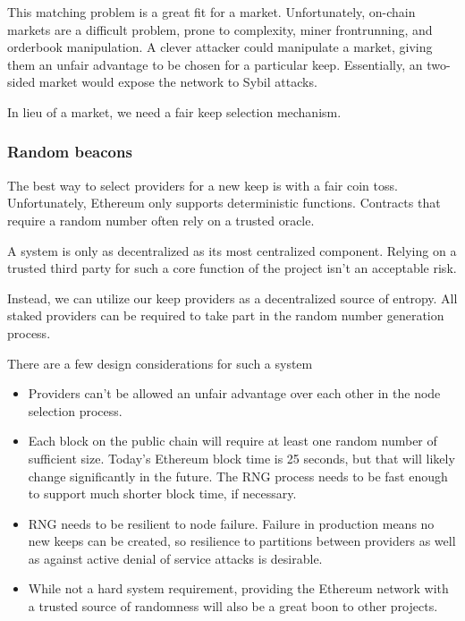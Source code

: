 \documentclass[11pt]{article}
\begin{document}
This matching problem is a great fit for a market. Unfortunately,
on-chain markets are a difficult problem, prone to complexity, miner
frontrunning, and orderbook manipulation. A clever attacker could
manipulate a market, giving them an unfair advantage to be chosen for
a particular keep. Essentially, an two-sided market would expose the
network to Sybil attacks.

In lieu of a market, we need a fair keep selection mechanism.

\subsubsection{Random beacons}

The best way to select providers for a new keep is with a fair coin
toss. Unfortunately, Ethereum only supports deterministic functions.
Contracts that require a random number often rely on a trusted oracle.

A system is only as decentralized as its most centralized component.
Relying on a trusted third party for such a core function of the
project isn't an acceptable risk.

Instead, we can utilize our keep providers as a decentralized source
of entropy. All staked providers can be required to take part in the
random number generation process.

There are a few design considerations for such a system
\begin{itemize}
  \item Providers can't be allowed an unfair advantage over each other
      in the node selection process.
  \item Each block on the public chain will require at least one
      random number of sufficient size. Today's Ethereum block time is
      25 seconds, but that will likely change significantly in the
      future. The RNG process needs to be fast enough to support much
      shorter block time, if necessary.
  \item RNG needs to be resilient to node failure. Failure in
      production means no new keeps can be created, so resilience
      to partitions between providers as well as against active denial
      of service attacks is desirable.
  \item While not a hard system requirement, providing the Ethereum
      network with a trusted source of randomness will also be a great
      boon to other projects.
\end{itemize}
\end{document}

